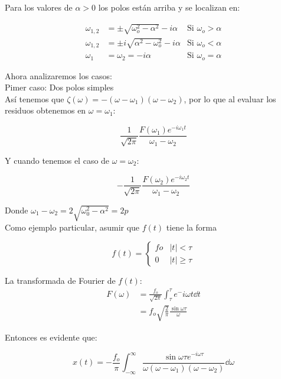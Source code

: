 \documentclass[11pt]{report}
\theoremstyle{plain}
\theoremstyle{definition}
\begin{document}
Para los valores de $\alpha > 0$ los polos están arriba y se localizan en:

\begin{align*}
	\omega_{1, 2} &= \pm \sqrt{\omega^2_o -\alpha^2} -i\alpha & \text{Si $\omega_o>\alpha$}\\
	\omega_{1, 2} &= \pm i\sqrt{\alpha^2-\omega^2_o}-i\alpha & \text{Si $\omega_o<\alpha$}\\
	\omega_{1} &=\omega_{2} = -i\alpha & \text{Si $\omega_o=\alpha$}
\end{align*}

Ahora analizaremos los casos:\\
Pimer caso: Dos polos simples\\
Así tenemos que $\zeta(\omega) = -(\omega-\omega_1)(\omega-\omega_2)$, por lo que al evaluar los residuos obtenemos en $\omega = \omega_1$:

\begin{equation*}
	\frac{1}{\sqrt{2\pi}}\frac{F(\omega_1)e^{-i\omega_1t}}{\omega_1 - \omega_2}
\end{equation*}

Y cuando tenemos el caso de $\omega = \omega_2$:

\begin{equation*}
	-\frac{1}{\sqrt{2\pi}}\frac{F(\omega_2)e^{-i\omega_2t}}{\omega_1 - \omega_2}
\end{equation*}

Donde $\omega_1-\omega_2 = 2\sqrt{\omega^2_0 -\alpha^2}=2p$\\

Como ejemplo particular, asumir que $f(t)$ tiene la forma

\begin{equation*}
	f(t)=
	\begin{cases}
		fo & |t|<\tau\\
		0 & |t|\geq\tau
	\end{cases}
\end{equation*}

La transformada de Fourier de $f(t)$:
\begin{align*}
	F(\omega)&=\frac{f_o}{\sqrt{2\pi}}\int_\tau^\tau e^-{i\omega t}\dd{t}\\
	&=f_o\sqrt{\frac{2}{\pi}}\frac{\sin 	\omega\tau}{\omega}
\end{align*}

Entonces es evidente que:

\begin{equation*}
	x(t)=-\frac{f_o}{\pi}\int_{-\infty}^\infty \frac{\sin\omega\tau e^{-i\omega\tau}}{\omega(\omega-\omega_1)(\omega-\omega_2)}\dd{\omega}
\end{equation*}
\end{document}
